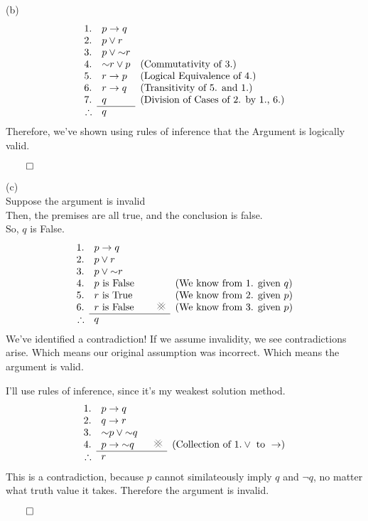 \documentclass{report}
\begin{document}
\sol (b)
$$
\argument{
	1. & p\lthen q &\\
	2. & p\lor r &\\
	3. & p\lor\lnot r &\\
	4. & \lnot r\lor p & (\text{Commutativity of 3.}) \\
	5. & r \lthen p	& (\text{Logical Equivalence of 4.}) \\
	6. & r \lthen q & (\text{Transitivity of 5. and 1.}) \\
	7. & q & (\text{Division of Cases of 2. by 1., 6.}) \\
}{q &}
$$
Therefore, we've shown using rules of inference that the Argument is logically valid.
\begin{flushright}$\qed$\end{flushright}

\sol (c) \\
Suppose the argument is invalid\\
Then, the premises are all true, and the conclusion is false.\\
So, $q$ is False.
$$
	\argument{
		1. & p\lthen q &\\
		2. & p\lor r &\\
		3. & p\lor\lnot r &\\
		4. & p \text{ is False } & (\text{We know from 1. given } q) \\
		5. & r \text{ is True } & (\text{We know from 2. given } p) \\
		6. & r \text{ is False }\qquad\contra & (\text{We know from 3. given } p) \\
	}{q &}
$$
We've identified a contradiction! If we assume invalidity, we see contradictions arise. Which means our original assumption was incorrect. Which means the argument is valid.

\sol I'll use rules of inference, since it's my weakest solution method.
\begin{gather*}
	\argument{
		1. & p\lthen q & \\
		2. & q\lthen r & \\
		3. & \lnot p\lor\lnot q & \\
		4. & p\lthen \lnot q\qquad\contra & (\text{Collection of 1.}\lor\text{ to }\lthen) \\
	}{r &}
\end{gather*}
This is a contradiction, because $p$ cannot similateously imply $q$ and $\lnot q$, no matter what truth value it takes. Therefore the argument is invalid.
\begin{flushright}$\qed$\end{flushright}
\end{document}
